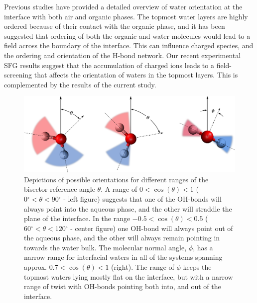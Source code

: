 Previous studies have provided a detailed overview of water orientation at the interface with both air and organic phases.\cite{McFearin2009,Hore2008,Fan2009,Wick2006c,Wick2008a} The topmost water layers are highly ordered because of their contact with the organic phase, and it has been suggested that ordering of both the organic and water molecules would lead to a field across the boundary of the interface.\cite{McFearin2009,Hore2008} This can influence charged species, and the ordering and orientation of the H-bond network. Our recent experimental SFG results suggest that the accumulation of charged ions leads to a field-screening that affects the orientation of waters in the topmost layers. This is complemented by the results of the current study.

\newcommand{\degree}{\ensuremath{^\circ}}

\begin{figure}[h!]
\begin{center}
	\includegraphics[scale=0.26]{images/h2o-angle-blurs.png}
	\caption{Depictions of possible orientations for different ranges of the bisector-reference angle $\theta$. A range of $0<\cos(\theta)<1$ ($0\degree<\theta<90\degree$ - left figure) suggests that one of the OH-bonds will always point into the aqueous phase, and the other will straddle the plane of the interface. In the range $-0.5<\cos(\theta)<0.5$ ($60\degree<\theta<120\degree$ - center figure) one OH-bond will always point out of the aqueous phase, and the other will always remain pointing in towards the water bulk. The molecular normal angle, $\phi$, has a narrow range for interfacial waters in all of the systems spanning approx. $0.7<\cos(\theta)<1$ (right). The range of $\phi$ keeps the topmost waters lying mostly flat on the interface, but with a narrow range of twist with OH-bonds pointing both into, and out of the interface.}
	\label{fig:angle-blurs}
\end{center}
\end{figure}

